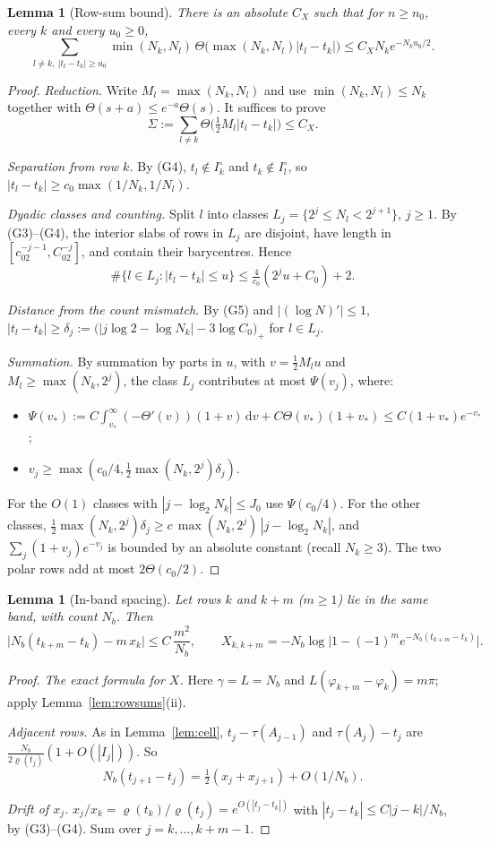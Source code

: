 \documentclass[11pt]{article}
\newtheorem{lemma}[theorem]{Lemma}
\theoremstyle{definition}
\theoremstyle{remark}
\newcommand{\dd}{\,\mathrm d}
\begin{document}
\begin{lemma}[Row-sum bound]\label{lem:rowsum}
There is an absolute $C_X$ such that for $n\ge n_0$, every $k$ and every $u_0\ge0$,
\[
\sum_{l\ne k,\ |t_l-t_k|\ge u_0}\min(N_k,N_l)\,\Theta\bigl(\max(N_k,N_l)|t_l-t_k|\bigr)\le C_XN_ke^{-N_ku_0/2} .
\]
\end{lemma}
\begin{proof}
\emph{Reduction.} Write $M_l=\max(N_k,N_l)$ and use $\min(N_k,N_l)\le N_k$ together with
$\Theta(s+a)\le e^{-a}\Theta(s)$. It suffices to prove
\[
\Sigma:=\sum_{l\neq k}\Theta\bigl(\tfrac12M_l|t_l-t_k|\bigr)\le C_X .
\]

\emph{Separation from row $k$.} By (G4), $t_l\notin I_k^\circ$ and $t_k\notin I_l^\circ$, so
$|t_l-t_k|\ge c_0\max(1/N_k,1/N_l)$.

\emph{Dyadic classes and counting.} Split $l$ into classes $L_j=\{2^j\le N_l<2^{j+1}\}$, $j\ge1$.
By (G3)--(G4), the interior slabs of rows in $L_j$ are disjoint, have length in
$[c_02^{-j-1},C_02^{-j}]$, and contain their barycentres. Hence
\[
\#\{l\in L_j:|t_l-t_k|\le u\}\le\tfrac{4}{c_0}(2^ju+C_0)+2 .
\]

\emph{Distance from the count mismatch.} By (G5) and $|(\log N)'|\le1$,
$|t_l-t_k|\ge\delta_j:=\bigl(|j\log2-\log N_k|-3\log C_0\bigr)_+$ for $l\in L_j$.

\emph{Summation.} By summation by parts in $u$, with $v=\tfrac12M_lu$ and
$M_l\ge\max(N_k,2^j)$, the class $L_j$ contributes at most $\Psi(v_j)$, where:
\begin{itemize}[leftmargin=*]
\item $\Psi(v_*):=C\int_{v_*}^\infty(-\Theta'(v))(1+v)\dd v+C\Theta(v_*)(1+v_*)\le C(1+v_*)e^{-v_*}$;
\item $v_j\ge\max(c_0/4,\tfrac12\max(N_k,2^j)\delta_j)$.
\end{itemize}
For the $O(1)$ classes with $|j-\log_2N_k|\le J_0$ use $\Psi(c_0/4)$. For the other classes,
$\tfrac12\max(N_k,2^j)\delta_j\ge c\,\max(N_k,2^j)\,|j-\log_2N_k|$, and
$\sum_j(1+v_j)e^{-v_j}$ is bounded by an absolute constant (recall $N_k\ge3$). The two polar rows
add at most $2\Theta(c_0/2)$.
\end{proof}

\begin{lemma}[In-band spacing]\label{lem:inband}
Let rows $k$ and $k+m$ ($m\ge1$) lie in the same band, with count $N_b$. Then
\[
\bigl|N_b(t_{k+m}-t_k)-m\,x_k\bigr|\le C\,\frac{m^2}{N_b},\qquad
X_{k,k+m}=-N_b\log\bigl|1-(-1)^me^{-N_b(t_{k+m}-t_k)}\bigr| .
\]
\end{lemma}
\begin{proof}
\emph{The exact formula for $X$.} Here $\gamma=L=N_b$ and $L(\varphi_{k+m}-\varphi_k)=m\pi$;
apply Lemma~\ref{lem:rowsums}(ii).

\emph{Adjacent rows.} As in Lemma~\ref{lem:cell}, $t_j-\tau(A_{j-1})$ and $\tau(A_j)-t_j$ are
$\frac{N_b}{2\varrho(t_j)}(1+O(|I_j|))$. So
\[
N_b(t_{j+1}-t_j)=\tfrac12(x_j+x_{j+1})+O(1/N_b).
\]

\emph{Drift of $x_j$.} $x_j/x_k=\varrho(t_k)/\varrho(t_j)=e^{O(|t_j-t_k|)}$ with
$|t_j-t_k|\le C|j-k|/N_b$, by (G3)--(G4). Sum over $j=k,\dots,k+m-1$.
\end{proof}
\end{document}
